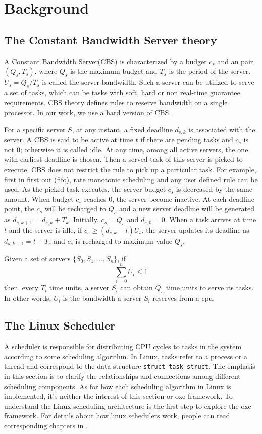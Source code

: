 \chapter{Background\label{chap:background}}
\section{The Constant Bandwidth Server theory\label{sec:CBS}}
A Constant Bandwidth Server(CBS) is characterized by a budget $c_s$ and
an pair $(Q_s, T_s)$, where $Q_s$ is the maximum budget and $T_s$
is the period of the server. $U_s = Q_s/T_s$ is called the server bandwidth.
Such a server can be utilized to serve a set of tasks, which can be 
tasks with soft, hard or non real-time guarantee requirements. 
CBS theory defines rules to reserve bandwidth on a single processor.
In our work, we use a hard version of CBS.

For a specific server $S$, at any instant, a fixed deadline $d_{s,k}$ is 
associated with the server. A CBS is said to be active at time $t$ if there 
are pending tasks and $c_s$ is not 0; otherwise it is called idle. 
At any time, among all active servers,
the one with earliest deadline is chosen. Then a served task of this server 
is picked to execute. CBS does not restrict the rule to pick up a particular 
task. For example, first in first out (fifo), rate monotonic scheduling and
any user defined rule can be used.
As the picked task executes, the server budget $c_s$ is decreased by the 
same amount. When budget $c_s$ reaches 0, the server become inactive. At 
each deadline point, the $c_s$ will be recharged to $Q_s$ and a new server 
deadline will be generated as $d_{s, k+1} = d_{s,k} + T_k$. Initially, 
$c_s = Q_s$ and $d_{s, 0} = 0$. When a task arrives at time $t$ and the 
server is idle, if $c_s \ge (d_{s,k} - t)U_s$, the server updates its 
deadline as $d_{s, k+1} = t + T_s$ and $c_s$ is recharged to maximum 
value $Q_s$.

Given a set of servers $\{S_0, S_1, ... , S_n\}$, if
\[
	\sum_{i=0}^n U_i \le 1
\]
then, every $T_i$ time units, a server $S_i$ can obtain $Q_s$ time units 
to serve its tasks. In other words, $U_i$ is the bandwidth a server $S_i$
reserves from a cpu.

\section{The Linux Scheduler\label{sec:LinuxSched}}
A scheduler is responsible for distributing CPU cycles to tasks in the system
according to some scheduling algorithm. In Linux, tasks refer to a process or 
a thread and correspond to the data structure \texttt{struct task\_struct}.
The emphasis in this section is to clarify the relationships and connections
among different scheduling components. As for how each scheduling algorithm 
in Linux is implemented, it's neither the interest of this section or oxc 
framework. To understand the Linux scheduling architecture is the first step 
to explore the oxc framework. For details about how linux schedulers work, 
people can read corresponding chapters in \cite{Wolf} \cite{R.Love}.

